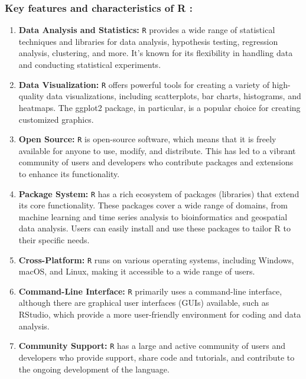 \documentclass[
]{book}
\begin{document}
\subsubsection*{Key features and characteristics of R :}\label{key-features-and-characteristics-of-r}

\begin{enumerate}
\def\labelenumi{\arabic{enumi}.}
\item
  \textbf{Data Analysis and Statistics:} \texttt{R} provides a wide range of statistical techniques and libraries for data analysis, hypothesis testing, regression analysis, clustering, and more. It's known for its flexibility in handling data and conducting statistical experiments.
\item
  \textbf{Data Visualization:} \texttt{R} offers powerful tools for creating a variety of high-quality data visualizations, including scatterplots, bar charts, histograms, and heatmaps. The ggplot2 package, in particular, is a popular choice for creating customized graphics.
\item
  \textbf{Open Source:} \texttt{R} is open-source software, which means that it is freely available for anyone to use, modify, and distribute. This has led to a vibrant community of users and developers who contribute packages and extensions to enhance its functionality.
\item
  \textbf{Package System:} \texttt{R} has a rich ecosystem of packages (libraries) that extend its core functionality. These packages cover a wide range of domains, from machine learning and time series analysis to bioinformatics and geospatial data analysis. Users can easily install and use these packages to tailor R to their specific needs.
\item
  \textbf{Cross-Platform:} \texttt{R} runs on various operating systems, including Windows, macOS, and Linux, making it accessible to a wide range of users.
\item
  \textbf{Command-Line Interface:} \texttt{R} primarily uses a command-line interface, although there are graphical user interfaces (GUIs) available, such as RStudio, which provide a more user-friendly environment for coding and data analysis.
\item
  \textbf{Community Support:} \texttt{R} has a large and active community of users and developers who provide support, share code and tutorials, and contribute to the ongoing development of the language.
\end{enumerate}
\end{document}
